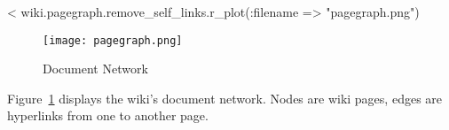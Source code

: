 \documentclass{scrartcl}
\begin{document}

<%
wiki.pagegraph.remove_self_links.r_plot(:filename => "pagegraph.png")

\begin{figure}
	\centering
	\texttt{[image: pagegraph.png]}
	\caption{Document Network}
	\label{fig:document_network}
\end{figure}

Figure~\ref{fig:document_network} displays the wiki's document network. Nodes are wiki pages, edges are hyperlinks from one to another page. 



\end{document}
